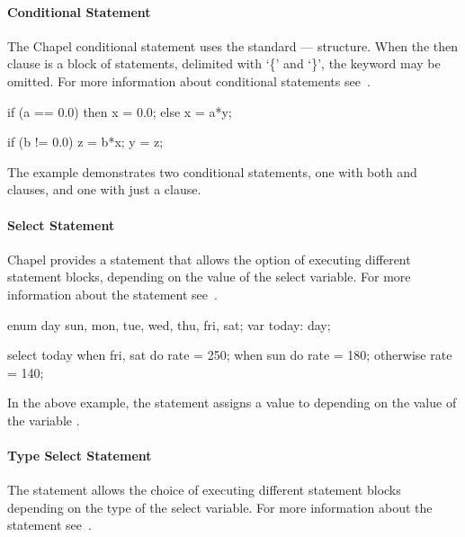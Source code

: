 \paragraph{Conditional Statement} 
The Chapel conditional statement uses the standard
---- structure.  When
the then clause is a block of statements, delimited with
`\{' and `\}', the  keyword may be omitted.
For more information about conditional statements 
see~.

\begin{example}
\begin{chapel}
if (a == 0.0) then 
  x = 0.0;
else 
  x = a*y;

if (b != 0.0) {
  z = b*x;
  y = z; 
}
\end{chapel}
The example demonstrates two conditional statements, one with
both  and  clauses, and one with just a
 clause.
\end{example}

\paragraph{Select Statement} 
Chapel provides a  statement that allows the option of
executing different statement blocks, depending on the value of the
select variable.  For more information about the 
statement see~.

\begin{example}
\begin{chapel}
enum day {sun, mon, tue, wed, thu, fri, sat};
var today: day;

select today {
  when fri, sat do rate = 250;
  when sun do rate = 180;
  otherwise rate = 140;
}
\end{chapel}
In the above example, the  statement assigns
a value to  depending on the value of the 
variable .
\end{example}

\paragraph{Type Select Statement} 
The  statement allows the choice of
executing different statement blocks depending on the type
of the select variable.  For more information about the
 statement see~.

